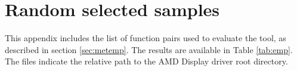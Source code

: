 \chapter{Random selected samples}

\label{app:emp}

This appendix includes the list of function pairs used to evaluate the tool, as 
described in section \ref{sec:metemp}. 
The results are available in Table \ref{tab:emp}. 
The files indicate the relative path to the AMD Display driver root directory.
















